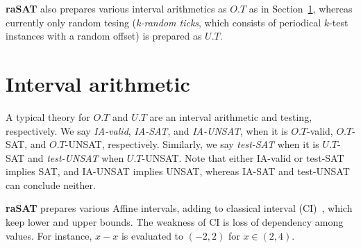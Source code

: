 \documentclass[runningheads,a4paper,oribibl]{llncs}
\newcommand{\Real}{{\mathbb R}}
\newcommand{\suppress}[1]{} %
\begin{document}
{\bf raSAT} also prepares various interval arithmetics as $O.T$ as in Section~\ref{sec:approximation}, 
whereas currently only random tesing (\emph{k-random ticks}, 
which consists of periodical $k$-test instances with a random offset) is prepared as $U.T$. 


\section{Interval arithmetic} \label{sec:approximation}

A typical theory for $O.T$ and $U.T$ are an interval arithmetic and testing, respectively. 
We say {\em IA-valid}, {\em IA-SAT}, and {\em IA-UNSAT}, when it is $O.T$-valid, $O.T$-SAT, and 
$O.T$-UNSAT, respectively. 
Similarly, we say {\em test-SAT} when it is $U.T$-SAT and {\em test-UNSAT} when $U.T$-UNSAT. 
Note that either IA-valid or test-SAT implies SAT, and IA-UNSAT implies UNSAT, 
whereas IA-SAT and test-UNSAT can conclude neither. 


\suppress{
\begin{definition}\label{def:testing}
Let $M = \bigwedge \limits_{i=1}^m x_i \in (a_i,b_i)$ and 
${\mathcal P} = \bigwedge \limits_{i=1}^m f_i(x_1,\cdots,x_n) > 0$. 
%
Let a choice function $\theta : (\Real \times \Real)^n \rightarrow \Real^n$ 
such that $\theta(M) \in (a_1,b_1) \times \cdots \times (a_n,b_n)$. 
Testing is a finite set $\Theta$ of choice functions. Then, we say 
\begin{itemize}
\item ${\mathcal P}$ is \emph{Test-SAT} under $M$ if $\theta(M)$ holds ${\mathcal P}$ 
for some $\theta \in \Theta$, and 
\item ${\mathcal P}$ is \emph{Test-UNSAT} under $M$ if $\theta(M)$ never holds ${\mathcal P}$ 
for each $\theta \in \Theta$. 
\end{itemize} 
\end{definition}
}


{\bf raSAT} prepares various Affine intervals, adding to classical interval (CI)~\cite{moore}, 
which keep lower and upper bounds. The weakness of CI is loss of dependency 
among values. For instance, $x - x$ is evaluated to $(-2,2)$ for $x \in (2,4)$. 
\end{document}
